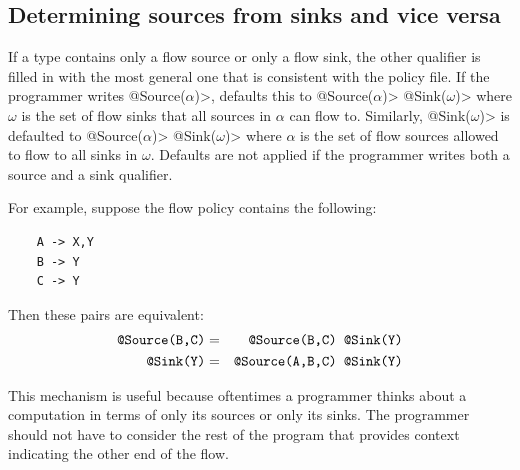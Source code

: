 \subsection{Determining sources from sinks and vice versa}
\label{sec:infer-from-flow-policy}

If a type contains only a flow source or only a flow sink, the other qualifier is
filled in with the most general one that is consistent
with the policy file.
%
If the programmer writes 
\<@Source($\alpha$)>, \theFlowChecker defaults this to
\<@Source($\alpha$)> \<@Sink($\omega$)> where $\omega$ is the
set of flow sinks that all sources in $\alpha$ can flow to.
%
Similarly,
\<@Sink($\omega$)> is defaulted to
\<@Source($\alpha$)> \<@Sink($\omega$)> where $\alpha$ is the
set of flow sources allowed to flow to all sinks in $\omega$.
%
Defaults are not applied if the programmer writes both a source and a
sink qualifier.

For example, suppose the flow policy contains the following:

\begin{Verbatim}
    A -> X,Y
    B -> Y
    C -> Y
\end{Verbatim}
  
\noindent 
Then these pairs are equivalent:
\begin{eqnarray*}
  \mbox{\<@Source({B,C})>} & = & \mbox{\<@Source({B,C}) @Sink(Y)>} \\
  \mbox{\<@Sink(Y)>}       & = & \mbox{\<@Source({A,B,C}) @Sink(Y)>}
\end{eqnarray*}

This mechanism is useful because oftentimes a programmer thinks about a
computation in terms of only its sources or only its sinks.
The programmer should not have to consider the rest of the program
that provides context indicating the other end of the flow.

\newcommand{\FCnumstubmethods}{10,553\xspace}
\newcommand{\FCnumstubmethodsrounded}{10,000\xspace}
\newcommand{\FCnumstubmethodswitheither}{915\xspace}
\newcommand{\FCnumstubmethodswithboth}{76\xspace}
\newcommand{\FCpercentstubmethodswithboth}{8\%\xspace}
\newcommand{\FCpercentstubmethodswithone}{92\%\xspace}


